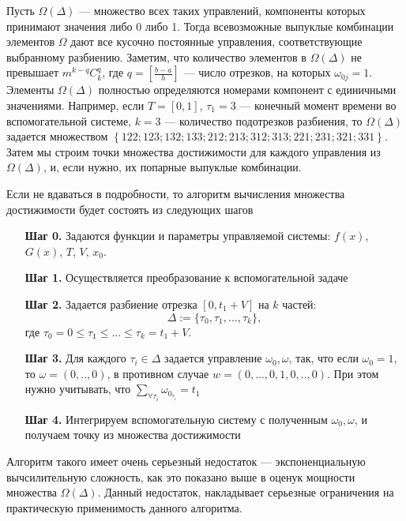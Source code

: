 Пусть $\Omega(\Delta)$ --- множество всех таких управлений, компоненты
которых принимают значения либо 0 либо 1. Тогда всевозможные выпуклые
комбинации элементов $\Omega$ дают все кусочно постоянные управления,
соответствующие выбранному разбиению.  Заметим, что количество
элементов в $\Omega(\Delta)$ не превышает $m^{k-q} C_k^q$, где
$q=\left[\frac{b-a}{h}\right]$ --- число отрезков, на которых
$\omega_{0j}=1$.  Элементы $\Omega(\Delta)$ полностью определяются
номерами компонент с единичными значениями. Например, если $T=[0,1]$,
$\tau_1=3$ --- конечный момент времени во вспомогательной системе,
$k=3$ --- количество подотрезков разбиения, то $\Omega(\Delta)$
задается множеством
$\left\{122; 123 ; 132 ; 133 ;212 ; 213; 312 ; 313 ; 221; 231 ; 321 ;
  331 \right\}$.
Затем мы строим точки множества достижимости для каждого управления из
$\Omega(\Delta)$, и, если нужно, их попарные выпуклые комбинации.

Если не вдаваться в подробности, то алгоритм вычисления множества
достижимости будет состоять из следующих шагов
\begin{itemize}
\item[\bf Шаг 0.] Задаются функции и параметры управляемой системы: $f(x)$, $G(x)$, $T$, $V$, $x_0.$
\item[\bf Шаг 1.] Осуществляется преобразование к вспомогательной задаче
\item[\bf Шаг 2.] Задается разбиение отрезка $[0,t_1+V]$
  на $k$ частей:    \begin{equation} \Delta:=\big\{ \tau_{0}, \tau_{1}, \ldots,
    \tau_{k}  \big\},
  \end{equation} где $\tau_{0}=0 \leq \tau_{1}\leq \ldots \leq \tau_{k}=t_1+V.$

\item[\bf Шаг 3.] Для каждого $\tau_{i}\in \Delta$ задается управление $\omega_0, \omega$, так, что если $\omega_0 = 1$, то $\omega = (0,..,0)$, в противном случае $w = (0,...,0,1,0,..,0)$. При этом нужно учитывать, что $\sum\limits_{\forall \tau_{i}} \omega_{0_{\tau_{i}}} = t_1$
\item[\bf Шаг 4.] Интегрируем вспомогательную систему с полученным $\omega_0, \omega$, и получаем точку из множества достижимости
\end{itemize}


Алгоритм такого имеет очень серьезный недостаток --- экспоненциальную
вычсилительную сложность, как это показано выше в оценук мощности
множества $\Omega(\Delta)$. Данный недостаток, накладывает серьезные
ограничения на практическую применимость данного алгоритма.

